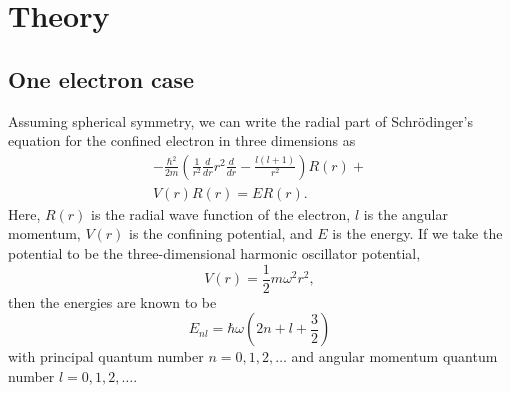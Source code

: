 \documentclass[aps,prc,reprint]{revtex4-1}
\begin{document}
\section{Theory}
\label{sec:theory}

    \subsection{One electron case}
    \label{sub:oneelec}
        Assuming spherical symmetry, we can write the radial part of Schr\"odinger's equation for the confined electron in three dimensions as
        \begin{multline}
            -\frac{\hbar^2}{2m} \left( \frac{1}{r^2} \frac{d}{dr} r^2 \frac{d}{dr} - \frac{l(l+1)}{r^2} \right) R(r) +{} \\ V(r)R(r) = ER(r).  \label{eq:genschro}
        \end{multline}
        Here, $R(r)$ is the radial wave function of the electron, $l$ is the angular momentum, $V(r)$ is the confining potential, and $E$ is the energy. If we take the potential to be the three-dimensional harmonic oscillator potential,
        \begin{equation}
            V(r) = \frac{1}{2} m \omega^2 r^2,
        \end{equation}
        then the energies are known to be
        \begin{equation}
            E_{nl} = \hbar\omega \left( 2n + l + \frac{3}{2} \right)
        \end{equation}
        with principal quantum number $n=0,1,2,\dots$ and angular momentum quantum number $l=0,1,2,\dots$. \cite{Shankar1994}
\end{document}
